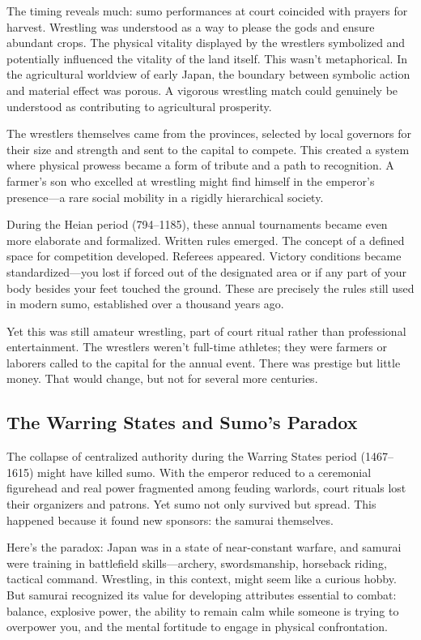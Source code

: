 The timing reveals much: sumo performances at court coincided with prayers for harvest. Wrestling was understood as a way to please the gods and ensure abundant crops. The physical vitality displayed by the wrestlers symbolized and potentially influenced the vitality of the land itself. This wasn't metaphorical. In the agricultural worldview of early Japan, the boundary between symbolic action and material effect was porous. A vigorous wrestling match could genuinely be understood as contributing to agricultural prosperity.

The wrestlers themselves came from the provinces, selected by local governors for their size and strength and sent to the capital to compete. This created a system where physical prowess became a form of tribute and a path to recognition. A farmer's son who excelled at wrestling might find himself in the emperor's presence—a rare social mobility in a rigidly hierarchical society.

During the Heian period (794--1185), these annual tournaments became even more elaborate and formalized. Written rules emerged. The concept of a defined space for competition developed. Referees appeared. Victory conditions became standardized—you lost if forced out of the designated area or if any part of your body besides your feet touched the ground. These are precisely the rules still used in modern sumo, established over a thousand years ago.

Yet this was still amateur wrestling, part of court ritual rather than professional entertainment. The wrestlers weren't full-time athletes; they were farmers or laborers called to the capital for the annual event. There was prestige but little money. That would change, but not for several more centuries.

\subsection{The Warring States and Sumo's Paradox}

The collapse of centralized authority during the Warring States period (1467--1615) might have killed sumo. With the emperor reduced to a ceremonial figurehead and real power fragmented among feuding warlords, court rituals lost their organizers and patrons. Yet sumo not only survived but spread. This happened because it found new sponsors: the samurai themselves.

Here's the paradox: Japan was in a state of near-constant warfare, and samurai were training in battlefield skills—archery, swordsmanship, horseback riding, tactical command. Wrestling, in this context, might seem like a curious hobby. But samurai recognized its value for developing attributes essential to combat: balance, explosive power, the ability to remain calm while someone is trying to overpower you, and the mental fortitude to engage in physical confrontation.

